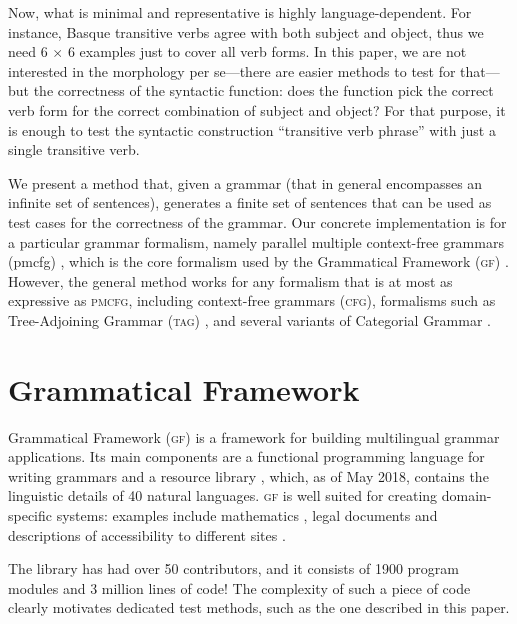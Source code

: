 \documentclass[11pt]{article}
\def\gf{\textsc{gf}}
\def\ccg{\textsc{ccg}}
\def\acg{\textsc{acg}}
\def\tag{\textsc{tag}}
\def\cfg{\textsc{cfg}}
\def\pmcfg{\textsc{pmcfg}}
\newcommand{\todo}[1]{{\color{cyan}\textbf{[TODO: }#1\textbf{]}}}
\begin{document}
Now, what is minimal and representative is highly language-dependent. 
For instance, Basque transitive verbs agree with both subject and
object, thus we need 6 $\times$ 6 examples just to cover all verb
forms. In this paper, we are not interested in the morphology per se---there are
easier methods to test for that---but the correctness of the syntactic
function: does the function pick the correct verb form for the correct
combination of subject and object? For that purpose, it is enough to
test the syntactic construction ``transitive verb phrase'' with just a
single transitive verb.

We present a method that, given a grammar (that in general encompasses an infinite set of sentences), generates a finite set of sentences that can be used as test cases for the correctness of the grammar. Our concrete implementation is for a particular grammar formalism,
namely parallel multiple context-free grammars ({\sc pmcfg})
\cite{seki91pmcfg}, which is the core formalism used by the
Grammatical Framework (\gf) \cite{ranta2004gf}. However, the general
method works for any formalism that is at most as expressive as
\pmcfg{}, including context-free grammars (\cfg), formalisms such as Tree-Adjoining Grammar (\tag)
\cite{joshi1975tag}, and several variants of Categorial Grammar
\cite{deGroote2004,steedman1988ccg}.


\section{Grammatical Framework}
\label{sec:GF}

Grammatical Framework (\gf) \cite{ranta2004gf} 
is a framework for building multilingual grammar applications. Its main
components are a functional programming language for writing grammars
and a resource library \cite{ranta2009rgl}, which, as of May 2018,
contains the linguistic details of 40 natural languages. \gf{} is well suited for creating domain-specific systems: examples include mathematics
\cite{caprotti2006webalt}, legal documents \cite{camilleri2017} and
descriptions of accessibility to different sites \cite{ranta2015grammar}.

The library
has had over 50 contributors, and it consists of 1900 program modules and 3
million lines of code! The complexity of such a piece of code clearly motivates dedicated test methods, such as the one described in this paper.
\end{document}
